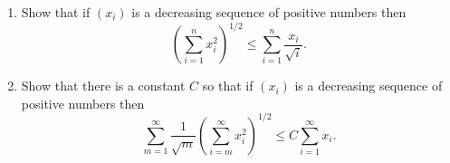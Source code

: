 \documentclass{article}
\begin{document}
\setlength{\parindent}{0pt}
\begin{enumerate}[label=\alph*)]
\item Show that if $(x_{i})$ is a decreasing sequence of positive numbers then $$\left(\sum_{i=1}^{n}x_{i}^{2}\right)^{1/2}\le\sum_{i=1}^{n}\frac{x_{i}}{\sqrt{i}}.$$
\item Show that there is a constant $C$ so that if $(x_{i})$ is a decreasing sequence of positive numbers then$$\sum_{m=1}^{\infty}\frac{1}{\sqrt{m}}\left(\sum_{i=m}^{\infty}x_{i}^{2}\right)^{1/2}\le C\sum_{i=1}^{\infty}x_{i}.$$
\end{enumerate}
\end{document}
